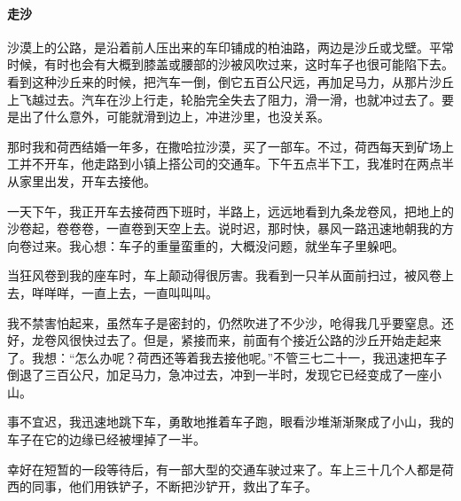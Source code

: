 \paragraph*{走沙}
\par 沙漠上的公路，是沿着前人压出来的车印铺成的柏油路，两边是沙丘或戈壁。平常时候，有时也会有大概到膝盖或腰部的沙被风吹过来，这时车子也很可能陷下去。看到这种沙丘来的时候，把汽车一倒，倒它五百公尺远，再加足马力，从那片沙丘上飞越过去。汽车在沙上行走，轮胎完全失去了阻力，滑一滑，也就冲过去了。要是出了什么意外，可能就滑到边上，冲进沙里，也没关系。
\par 那时我和荷西结婚一年多，在撒哈拉沙漠，买了一部车。不过，荷西每天到矿场上工并不开车，他走路到小镇上搭公司的交通车。下午五点半下工，我准时在两点半从家里出发，开车去接他。
\par 一天下午，我正开车去接荷西下班时，半路上，远远地看到九条龙卷风，把地上的沙卷起，卷卷卷，一直卷到天空上去。说时迟，那时快，暴风一路迅速地朝我的方向卷过来。我心想：车子的重量蛮重的，大概没问题，就坐车子里躲吧。
\par 当狂风卷到我的座车时，车上颠动得很厉害。我看到一只羊从面前扫过，被风卷上去，咩咩咩，一直上去，一直叫叫叫。
\par 我不禁害怕起来，虽然车子是密封的，仍然吹进了不少沙，呛得我几乎要窒息。还好，龙卷风很快过去了。但是，紧接而来，前面有个接近公路的沙丘开始走起来了。我想：“怎么办呢？荷西还等着我去接他呢。”不管三七二十一，我迅速把车子倒退了三百公尺，加足马力，急冲过去，冲到一半时，发现它已经变成了一座小山。
\par 事不宜迟，我迅速地跳下车，勇敢地推着车子跑，眼看沙堆渐渐聚成了小山，我的车子在它的边缘已经被埋掉了一半。
\par 幸好在短暂的一段等待后，有一部大型的交通车驶过来了。车上三十几个人都是荷西的同事，他们用铁铲子，不断把沙铲开，救出了车子。
